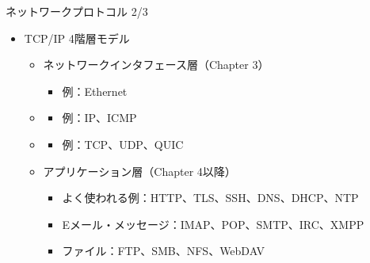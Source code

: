 \documentclass[12pt,aspectratio=169]{beamer}
\begin{document}
\begin{frame}{ネットワークプロトコル 2/3}

  \begin{itemize}
    \item TCP/IP 4階層モデル
      \begin{itemize}
        \item ネットワークインタフェース層（Chapter 3）
          \begin{itemize}
            \item 例：Ethernet
          \end{itemize}
        \item {}
          \begin{itemize}
            \item 例：IP、ICMP
          \end{itemize}
        \item {}
          \begin{itemize}
            \item 例：TCP、UDP、QUIC
          \end{itemize}
        \item アプリケーション層（Chapter 4以降）
          \begin{itemize}
            \item よく使われる例：HTTP、TLS、SSH、DNS、DHCP、NTP
            \item Eメール・メッセージ：IMAP、POP、SMTP、IRC、XMPP
            \item ファイル：FTP、SMB、NFS、WebDAV
          \end{itemize}

      \end{itemize}

  \end{itemize}

\end{frame}
\end{document}
